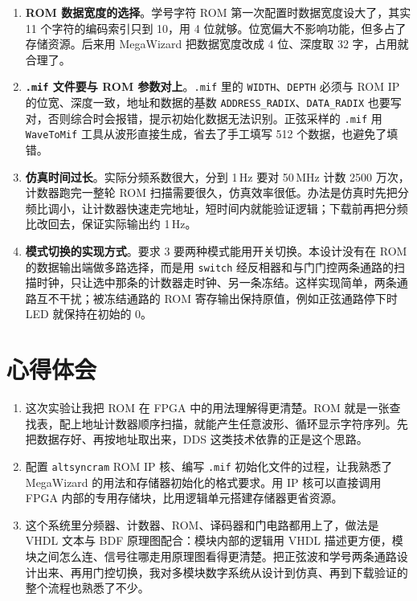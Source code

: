 \documentclass[12pt]{ctexart}
\begin{document}
\begin{enumerate}
    \item \textbf{ROM 数据宽度的选择}。学号字符 ROM 第一次配置时数据宽度设大了，其实 11 个字符的编码索引只到 10，用 4 位就够。位宽偏大不影响功能，但多占了存储资源。后来用 MegaWizard 把数据宽度改成 4 位、深度取 32 字，占用就合理了。
    \item \textbf{\texttt{.mif} 文件要与 ROM 参数对上}。\texttt{.mif} 里的 \texttt{WIDTH}、\texttt{DEPTH} 必须与 ROM IP 的位宽、深度一致，地址和数据的基数 \texttt{ADDRESS\_RADIX}、\texttt{DATA\_RADIX} 也要写对，否则综合时会报错，提示初始化数据无法识别。正弦采样的 \texttt{.mif} 用 \texttt{WaveToMif} 工具从波形直接生成，省去了手工填写 512 个数据，也避免了填错。
    \item \textbf{仿真时间过长}。实际分频系数很大，分到 1\,Hz 要对 50\,MHz 计数 2500 万次，计数器跑完一整轮 ROM 扫描需要很久，仿真效率很低。办法是仿真时先把分频比调小，让计数器快速走完地址，短时间内就能验证逻辑；下载前再把分频比改回去，保证实际输出约 1\,Hz。
    \item \textbf{模式切换的实现方式}。要求 3 要两种模式能用开关切换。本设计没有在 ROM 的数据输出端做多路选择，而是用 \texttt{switch} 经反相器和与门门控两条通路的扫描时钟，只让选中那条的计数器走时钟、另一条冻结。这样实现简单，两条通路互不干扰；被冻结通路的 ROM 寄存输出保持原值，例如正弦通路停下时 LED 就保持在初始的 0。
\end{enumerate}

\section{心得体会}

\begin{enumerate}
    \item 这次实验让我把 ROM 在 FPGA 中的用法理解得更清楚。ROM 就是一张查找表，配上地址计数器顺序扫描，就能产生任意波形、循环显示字符序列。先把数据存好、再按地址取出来，DDS 这类技术依靠的正是这个思路。
    \item 配置 \texttt{altsyncram} ROM IP 核、编写 \texttt{.mif} 初始化文件的过程，让我熟悉了 MegaWizard 的用法和存储器初始化的格式要求。用 IP 核可以直接调用 FPGA 内部的专用存储块，比用逻辑单元搭建存储器更省资源。
    \item 这个系统里分频器、计数器、ROM、译码器和门电路都用上了，做法是 VHDL 文本与 BDF 原理图配合：模块内部的逻辑用 VHDL 描述更方便，模块之间怎么连、信号往哪走用原理图看得更清楚。把正弦波和学号两条通路设计出来、再用门控切换，我对多模块数字系统从设计到仿真、再到下载验证的整个流程也熟悉了不少。
\end{enumerate}
\end{document}
